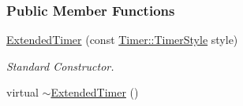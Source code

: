 \subsubsection*{Public Member Functions}
\begin{DoxyCompactItemize}
\item 
\hyperlink{classMezzanine_1_1ExtendedTimer_a95b443054801f5daba6c9e7d11c01f83}{ExtendedTimer} (const \hyperlink{classMezzanine_1_1Timer_a1db436d4e0d6f1676e41ba3cb2ea3aaa}{Timer::TimerStyle} style)
\begin{DoxyCompactList}\small\item\em Standard Constructor. \item\end{DoxyCompactList}\item 
\hypertarget{classMezzanine_1_1ExtendedTimer_ab628823999966c35b86e26bfd15d0240}{
virtual \hyperlink{classMezzanine_1_1ExtendedTimer_ab628823999966c35b86e26bfd15d0240}{$\sim$ExtendedTimer} ()}
\label{classMezzanine_1_1ExtendedTimer_ab628823999966c35b86e26bfd15d0240}


\end{DoxyCompactItemize}

